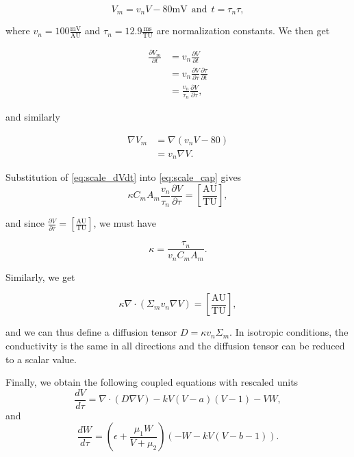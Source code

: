 $$
V_m=v_nV-80\mathrm{mV} ~~\text{and}~~ t=\tau_n\tau,
$$

where $v_n=100\frac{\mathrm{mV}}{\mathrm{AU}}$ and $\tau_n=12.9\frac{\mathrm{ms}}{\mathrm{TU}}$ are normalization constants. We then get

\begin{equation}
\begin{aligned}
    \frac{\partial V_m}{\partial t}&= v_n\frac{\partial V}{\partial t}\\
    &=v_n\frac{\partial V}{\partial \tau}\frac{\partial \tau}{\partial t}\\
    &=\frac{v_n}{\tau_n}\frac{\partial V}{\partial \tau},
    \label{eq:scale_dVdt}
\end{aligned}
\end{equation}

and similarly

\begin{equation}
\begin{aligned}
    \nabla V_m &= \nabla (v_nV -80)\\
    &=v_n\nabla V.
    \end{aligned}
    \label{eq:scale_nablaV}
\end{equation}

Substitution of \eqref{eq:scale_dVdt} into \eqref{eq:scale_cap} gives
\begin{equation}
\kappa C_mA_m\frac{v_n}{\tau_n}\frac{\partial V}{\partial \tau}=\left[\frac{\mathrm{AU}}{\mathrm{TU}}\right],
\end{equation}

and since $\frac{\partial V}{\partial \tau}=\left[\frac{\mathrm{AU}}{\mathrm{TU}}\right]$, we must have

$$
\kappa = \frac{\tau_n}{v_nC_mA_m}.
$$

Similarly, we get

$$
\kappa\nabla \cdot (\Sigma_m v_n \nabla V)=\left[\frac{\mathrm{AU}}{\mathrm{TU}}\right],
$$

and we can thus define a diffusion tensor $D=\kappa v_n \Sigma_m$. In isotropic conditions, the conductivity is the same in all directions and the diffusion tensor can be reduced to a scalar value.

Finally, we obtain the following coupled equations with rescaled units
\begin{equation}
\label{eq:dvdt_AP}
    \frac{dV}{d\tau}=\nabla \cdot (D \nabla V) - kV(V-a)(V-1)-VW,
\end{equation}
and
\begin{equation}
\label{dwdt_AP}
    \frac{dW}{d\tau}= (\epsilon + \frac{\mu_1W}{V+\mu_2})(-W-kV(V-b-1)).
\end{equation}















